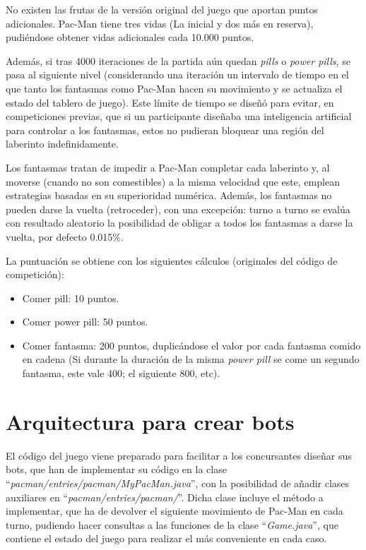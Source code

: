 No existen las frutas de la versión original del juego que aportan puntos adicionales.
Pac-Man tiene tres vidas (La inicial y dos más en reserva), pudiéndose obtener vidas adicionales cada 10.000 puntos.

Además, si tras 4000 iteraciones de la partida aún quedan \textit{pills} o \textit{power pills}, se pasa al siguiente nivel (considerando una iteración un intervalo de tiempo en el que tanto los fantasmas como Pac-Man hacen su movimiento y se actualiza el estado del tablero de juego). Este límite de tiempo se diseñó para evitar, en competiciones previas, que si un participante diseñaba una inteligencia artificial para controlar a los fantasmas, estos no pudieran bloquear una región del laberinto indefinidamente.
 
Los fantasmas tratan de impedir a Pac-Man completar cada laberinto y, al moverse (cuando no son comestibles) a la misma velocidad que este, emplean estrategias basadas en su superioridad numérica. Además, los fantasmas no pueden darse la vuelta (retroceder), con una excepción: turno a turno se evalúa con resultado aleatorio la posibilidad de obligar a todos los fantasmas a darse la vuelta, por defecto 0.015\%.
 
La puntuación se obtiene con los siguientes cálculos (originales del código de competición):
\begin{itemize}
\item Comer pill: 10 puntos.
\item Comer power pill: 50 puntos.
\item Comer fantasma: 200 puntos, duplicándose el valor por cada fantasma comido en cadena (Si durante la duración de la misma \textit{power pill} se come un segundo fantasma, este vale 400; el siguiente 800, etc).
\end{itemize}

\section{Arquitectura para crear bots}
El código del juego viene preparado para facilitar a los concursantes diseñar sus bots, que han de implementar su código en la clase ``\textit{pacman/entries/pacman/MyPacMan.java}'', con la posibilidad de añadir clases auxiliares en ``\textit{pacman/entries/pacman/}''. Dicha clase incluye el método a implementar, que ha de devolver el siguiente movimiento de Pac-Man en cada turno, pudiendo hacer consultas a las funciones de la clase ``\textit{Game.java}'', que contiene el estado del juego para realizar el más conveniente en cada caso.
 
